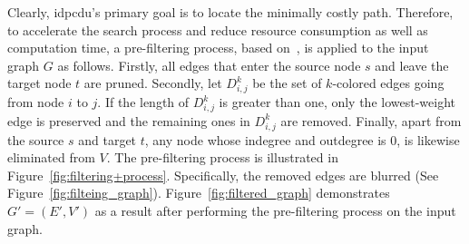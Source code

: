 Clearly, \gls{idpcdu}'s primary goal is to locate the minimally costly path. Therefore, to accelerate the search process and reduce resource consumption as well as computation time, a pre-filtering process, based on~\cite{binh2021two}, is applied to the input graph $G$ as follows. Firstly, all edges that enter the source node $s$ and leave the target node $t$ are pruned. Secondly, let $D^k_{i,j}$ be the set of $k$-colored edges going from node $i$ to $j$. If the length of $D^k_{i,j}$ is greater than one, only the lowest-weight edge is preserved and the remaining ones in $D^k_{i,j}$ are removed. Finally, apart from the source $s$ and target $t$, any node whose indegree and outdegree is 0, is likewise eliminated from $V$. 
The pre-filtering process is illustrated in Figure~\ref{fig:filtering+process}. Specifically, the removed edges are blurred (See Figure~\ref{fig:filteing_graph}). Figure~\ref{fig:filtered_graph} demonstrates $G'=(E', V')$ as a result after performing the pre-filtering process on the input graph.


